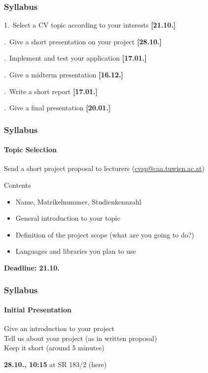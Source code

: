 \documentclass[xetex,professionalfont]{beamer}
\newcommand{\highlight}[1]{\textcolor{tuwcvl_inf_red}{\textbf{#1}}}
\begin{document}

\begin{frame}
\frametitle{Syllabus}

1.\ Select a CV topic according to your interests \highlight{[21.10.]}

.\ Give a short presentation on your project \highlight{[28.10.]}

.\ Implement and test your application \highlight{[17.01.]}

.\ Give a midterm presentation \highlight{[16.12.]}

.\ Write a short report \highlight{[17.01.]}

.\ Give a final presentation \highlight{[20.01.]}

\end{frame}


\begin{frame}
\frametitle{Syllabus}
\framesubtitle{Topic Selection}

Send a short project proposal to lecturers (\url{cvsp@caa.tuwien.ac.at})

\bigskip
Contents
\begin{itemize}
	\item Name, Matrikelnummer, Studienkennzahl
	\item General introduction to your topic
	\item Definition of the project scope (what are you going to do?)
	\item Languages and libraries you plan to use
\end{itemize}

\bigskip
\highlight{Deadline: 21.10.}

\end{frame}


\begin{frame}
\frametitle{Syllabus}
\framesubtitle{Initial Presentation}

Give an introduction to your project\\\medskip
Tell us about your project (as in written proposal)\\\medskip
Keep it short (around 5 minutes)

\bigskip
\highlight{28.10., 10:15} at SR 183/2 (here)

\end{frame}
\end{document}
